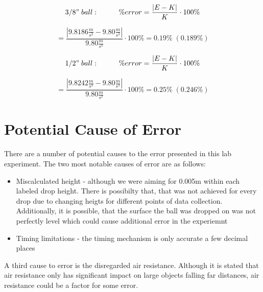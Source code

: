 \newpage

\begin{equation*}
  3/8" \; ball: \hspace{1cm} \%error = \frac{|E - K|}{K} \cdot 100\%
\end{equation*}

\begin{equation*}
  = \frac{|9.8186\frac{m}{s^2} - 9.80\frac{m}{s^2}|}{9.80\frac{m}{s^2}} \cdot 100\% = 0.19\% \; (0.189\%)
\end{equation*}

\begin{equation*}
  1/2" \; ball: \hspace{1cm} \%error = \frac{|E - K|}{K} \cdot 100\%
\end{equation*}

\begin{equation*}
  = \frac{|9.8242\frac{m}{s^2} - 9.80\frac{m}{s^2}|}{9.80\frac{m}{s^2}} \cdot 100\% = 0.25\% \; (0.246\%)
\end{equation*}

\section{Potential Cause of Error}
There are a number of potential causes to the error presented in this lab 
experiment. The two most notable causes of error are as follows:
\begin{itemize}
  \item Miscalculated height - although we were aiming for 0.005m within each labeled
    drop height. There is possibilty that, that was not achieved for every drop due to changing
    heigts for different points of data collection. Additionally, it is possible, that 
    the surface the ball was dropped on was not perfectly level which could cause additional
    error in the experiemnt
  \item Timing limitations - the timing mechanism is only accurate a few decimal places\\
\end{itemize}
A third cause to error is the disregarded air resistance. Although it is stated 
that air resistance only has significant impact on large objects falling far distances,
air resistance could be a factor for some error.
    

